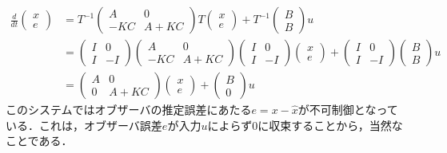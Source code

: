 \begin{align}
 \frac{d}{dt}
  \left(\begin{array}{c}
         x \\
	 e
	\end{array}\right)
  &=
  T^{-1}
  \left(\begin{array}{cc}
         A & 0 \\
	 -KC & A+KC
	\end{array}\right)
  T
  \left(\begin{array}{c}
         x \\
	 e
	\end{array}\right)
  +
  T^{-1}
  \left(\begin{array}{c}
         B \\
	 B
	\end{array}\right)
  u
\nonumber \\
  &=
 \left(\begin{array}{cc}
        I & 0 \\
	I & -I
       \end{array}\right)
  \left(\begin{array}{cc}
         A & 0 \\
	 -KC & A+KC
	\end{array}\right)
 \left(\begin{array}{cc}
        I & 0 \\
	I & -I
       \end{array}\right)
  \left(\begin{array}{c}
         x \\
	 e
	\end{array}\right)
  +
 \left(\begin{array}{cc}
        I & 0 \\
	I & -I
       \end{array}\right)
  \left(\begin{array}{c}
         B \\
	 B
	\end{array}\right)
  u
\nonumber \\
  &=
  \left(\begin{array}{cc}
         A & 0 \\
	 0 & A+KC
	\end{array}\right)
  \left(\begin{array}{c}
         x \\
	 e
	\end{array}\right)
  +
  \left(\begin{array}{c}
         B \\
	 0
	\end{array}\right)
  u
\end{align}
このシステムではオブザーバの推定誤差にあたる$e=x-\hat{x}$が不可制御となっている．これは，オブザーバ誤差$e$が入力$u$によらず$0$に収束することから，当然なことである．


